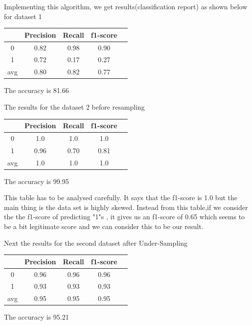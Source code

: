 Implementing this algorithm, we get results(classification report) as shown below for dataset 1
\begin{center}
\begin{tabular}{| c | c | c | c | c |}
\hline
    & Precision & Recall & f1-score \\
\hline
0 & 0.82 & 0.98 & 0.90 \\
\hline
1 & 0.72 & 0.17 & 0.27 \\
\hline
avg & 0.80 & 0.82 & 0.77 \\
\hline
\end{tabular}
\end{center} 
\begin{center}
The accuracy is 81.66%
\end{center}
The results for the dataset 2 before resampling
\begin{center}
\begin{tabular}{| c | c | c | c | c |}
\hline
    & Precision & Recall & f1-score \\
\hline
0 & 1.0 & 1.0 & 1.0\\
\hline
1 & 0.96 & 0.70 & 0.81\\
\hline
avg & 1.0 & 1.0 & 1.0 \\
\hline
\end{tabular}
\end{center}
\begin{center}
The accuracy is 99.95%
\end{center} 
 This table has to be analysed carefully. It says that the f1-score is 1.0 but the main thing is the data set is highly skewed. Instead from this table,if we consider the the f1-score of predicting "1"s , it gives us an f1-score of 0.65 which seems to be a bit legitimate score and we can consider this to be our result.\par
 Next the results for the second dataset after Under-Sampling
 \begin{center}
\begin{tabular}{| c | c | c | c | c |}
\hline
    & Precision & Recall & f1-score \\
\hline
0 & 0.96 & 0.96 & 0.96 \\
\hline
1 & 0.93 & 0.93 & 0.93 \\
\hline
avg & 0.95 & 0.95 & 0.95\\
\hline 
\end{tabular}
\end{center}
\begin{center}
The accuracy is 95.21%
\end{center} 
